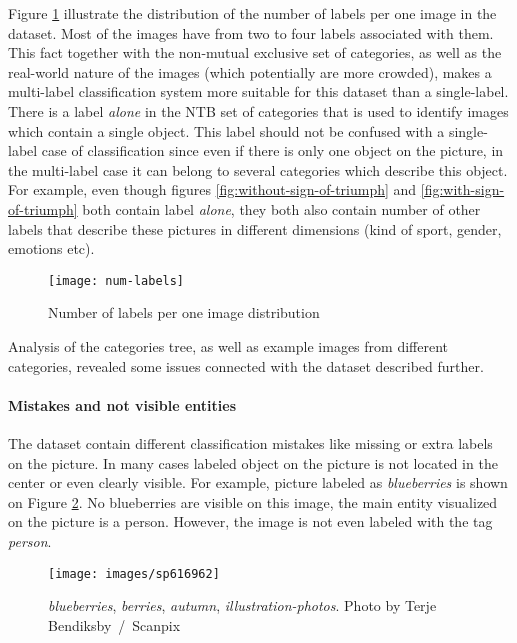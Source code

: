 Figure \ref{fig:num-labels} illustrate the distribution of the number of labels per one image in the dataset. Most of the images have from two to four labels associated with them. This fact together with the non-mutual exclusive set of categories, as well as the real-world nature of the images (which potentially are more crowded), makes a multi-label classification system more suitable for this dataset than a single-label. There is a label \textit{alone} in the NTB set of categories that is used to identify images which contain a single object. This label should not be confused with a single-label case of classification since even if there is only one object on the picture, in the multi-label case it can belong to several categories which describe this object. For example, even though figures \ref{fig:without-sign-of-triumph} and \ref{fig:with-sign-of-triumph} both contain label \textit{alone}, they both also contain number of other labels that describe these pictures in different dimensions (kind of sport, gender, emotions etc).

\begin{figure}[h!]
    \centering
    \texttt{[image: num-labels]}
    \caption{Number of labels per one image distribution}
    \label{fig:num-labels}
\end{figure}

Analysis of the categories tree, as well as example images from different categories, revealed some issues connected with the dataset described further.

\paragraph{Mistakes and not visible entities}
The dataset contain different classification mistakes like missing or extra labels on the picture. In many cases labeled object on the picture is not located in the center or even clearly visible. For example, picture labeled as \textit{blueberries} is shown on Figure \ref{fig:image-blueberries}. No blueberries are visible on this image, the main entity visualized on the picture is a person. However, the image is not even labeled with the tag \textit{person}. 

\begin{figure}[h]
    \centering
    \texttt{[image: images/sp616962]}
    \caption[Example picture from the \textit{blueberries} category]{\textit{blueberries}, \textit{berries}, \textit{autumn}, \textit{illustration-photos}. Photo by Terje Bendiksby~/~Scanpix}
    \label{fig:image-blueberries}
\end{figure}

